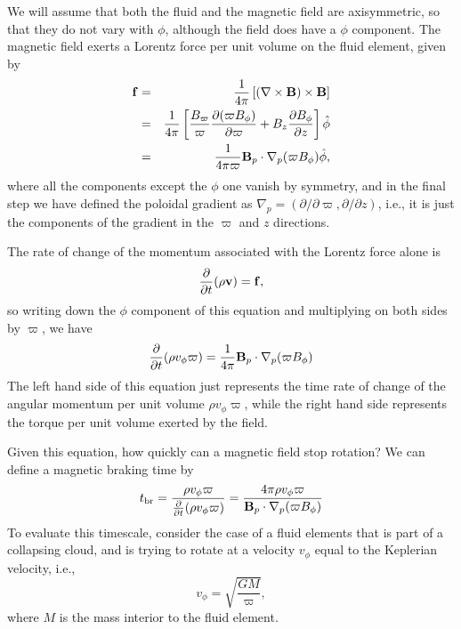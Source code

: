 We will assume that both the fluid and the magnetic field are axisymmetric, so that they do not vary with $\phi$, although the field does have a $\phi$ component. The magnetic field exerts a Lorentz force per unit volume on the fluid element, given by
\begin{eqnarray}
\mathbf{f} & = & \frac{1}{4\pi} \left[(\nabla\times\mathbf{B})\times \mathbf{B}\right] \\
& = & \frac{1}{4\pi} \left[\frac{B_\varpi}{\varpi} \frac{\partial(\varpi B_\phi)}{\partial \varpi} + B_z  \frac{\partial B_\phi}{\partial z}\right] \hat{\phi}\\
& = & \frac{1}{4\pi\varpi} \mathbf{B}_p \cdot \nabla_p (\varpi B_{\phi}) \hat{\phi},
\end{eqnarray}
where all the components except the $\phi$ one vanish by symmetry, and in the final step we have defined the poloidal gradient as $\nabla_p = (\partial/\partial\varpi, \partial/\partial z)$, i.e., it is just the components of the gradient in the $\varpi$ and $z$ directions.

The rate of change of the momentum associated with the Lorentz force alone is
\begin{equation}
\frac{\partial}{\partial t}(\rho \mathbf{v}) = \mathbf{f},
\end{equation}
so writing down the $\phi$ component of this equation and multiplying on both sides by $\varpi$, we have
\begin{equation}
\frac{\partial}{\partial t} (\rho v_{\phi} \varpi) = \frac{1}{4\pi} \mathbf{B}_p\cdot\nabla_p(\varpi B_\phi)
\end{equation}
The left hand side of this equation just represents the time rate of change of the angular momentum per unit volume $\rho v_{\phi} \varpi$, while the right hand side represents the torque per unit volume exerted by the field.

Given this equation, how quickly can a magnetic field stop rotation? We can define a magnetic braking time by
\begin{equation}
t_{\rm br} = \frac{\rho v_{\phi} \varpi}{\frac{\partial}{\partial t} (\rho v_{\phi} \varpi)}
= \frac{4 \pi \rho v_{\phi} \varpi}{\mathbf{B}_p \cdot\nabla_p (\varpi B_\phi)}
\end{equation}
To evaluate this timescale, consider the case of a fluid elements that is part of a collapsing cloud, and is trying to rotate at a velocity $v_{\phi}$ equal to the Keplerian velocity, i.e.,
\begin{equation}
v_{\phi} = \sqrt{\frac{GM}{\varpi}},
\end{equation}
where $M$ is the mass interior to the fluid element.

